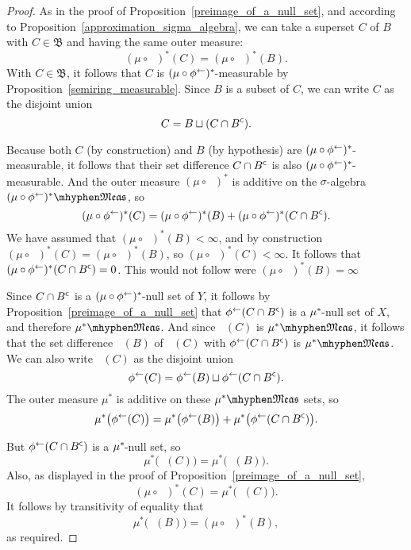 \documentclass[
twoside=true,
paper=letter,
fontsize=9pt,
pagesize=auto,
leqno,
openany,
headsepline,
overfullrule,
]{scrbook}
\theoremstyle{plain}
\theoremstyle{plain}
\theoremstyle{definition}
\theoremstyle{bfnoteitalic}
\theoremstyle{bfnoteroman}
\newcommand{\sigalg}[1]{\mathfrak{#1}}
\newcommand{\textsigma}{\hbox{\large{$\sigma$}}\kern-1pt}
\newcommand{\comp}{^{\hbox{\tiny{$\mathsf C$}}}}
\newcommand{\preimage}[1]{\mathop{#1^{\leftarrow}}}
\newcommand{\meets}{\cap}
\newcommand{\sigmaalgebraii}{\sigalg{B}}
\newcommand{\measurable}[1]{{#1}\mhyphen\mathfrak{Meas}}
\newcommand{\kernast}{\ast\kern-1pt}
\newcommand{\measurespace}{X}
\newcommand{\measurespaceii}{Y}
\newcommand{\measure}{\mu}
\begin{document}
\begin{proof}
As in the proof of Proposition~\ref{preimage_of_a_null_set}, and according to Proposition~\ref{approximation_sigma_algebra}, we can take a superset $C$ of $B$ with $C\in\sigmaalgebraii$ and having the same outer measure: 
\[
(\measure\circ\preimage{\phi})^*(C) =
(\measure\circ\preimage{\phi})^*(B).
\]
With $C\in\sigmaalgebraii$, it follows that $C$ is $(\measure\circ\preimage{\phi})^\kernast$-measurable by Proposition~\ref{semiring_measurable}.
Since $B$ is a subset of $C$, we can write $C$ as the disjoint union
\[
C=B\sqcup (C\meets B\comp).
\]

Because both $C$ (by construction) and $B$ (by hypothesis) are $(\measure\circ\preimage{\phi})^\kernast$-measurable, it follows that their set difference $C\meets B\comp$ is also $(\measure\circ\preimage{\phi})^\kernast$-measurable. And the outer measure 
$(\measure\circ\preimage{\phi})^*$ is additive on the \textsigma-algebra $\measurable{(\measure\circ\preimage{\phi})^*}$, so
\[
(\measure\circ\preimage{\phi})^*(C) =
(\measure\circ\preimage{\phi})^*(B) +
(\measure\circ\preimage{\phi})^*(C\meets B\comp).
\]
We have assumed that $(\measure\circ\preimage{\phi})^*(B) <\infty$, and by construction 
$(\measure\circ\preimage{\phi})^*(C) =
(\measure\circ\preimage{\phi})^*(B)$, so $(\measure\circ\preimage{\phi})^*(C) <\infty$.
It follows that 
$(\measure\circ\preimage{\phi})^*(C\meets B\comp) =0$. This would not follow were 
$(\measure\circ\preimage{\phi})^*(B) = \infty$

Since $C\meets B\comp$ is a $(\measure\circ\preimage{\phi})^\kernast$-null set of $\measurespaceii$, it follows by Proposition~\ref{preimage_of_a_null_set} that 
$\preimage{\phi}(C\meets B\comp)$ is a $\measure^\kernast$-null set of $\measurespace$, and therefore $\measurable{\measure^*}$. And since $\preimage{\phi}(C)$ is $\measurable{\measure^*}$, it follows that the set difference $\preimage{\phi}(B)$ of $\preimage{\phi}(C)$ with $\preimage{\phi}(C\meets B\comp)$ is $\measurable{\measure^*}$.
We can also write $\preimage{\phi}(C)$ as the disjoint union
\[
\preimage{\phi}(C) =
\preimage{\phi}(B) \sqcup \preimage{\phi}(C\meets B\comp).
\]
The outer measure $\measure^*$ is additive on these $\measurable{\measure^*}$ sets, so
\[
\measure^*\bigl(\preimage{\phi}(C)\bigr) = 
\measure^*\bigl(\preimage{\phi}(B)\bigr) +
\measure^*\bigl(\preimage{\phi}(C\meets B\comp)\bigr).
\]

But $\preimage{\phi}(C\meets B\comp)$ is a $\measure^\kernast$-null set, so 
\[
\measure^*\bigl(\preimage{\phi}(C)\bigr) = 
\measure^*\bigl(\preimage{\phi}(B)\bigr).
\]
Also, as displayed in the proof of Proposition~\ref{preimage_of_a_null_set},
\[
(\measure\circ\preimage{\phi})^*(C)
=
\measure^*\bigl(\preimage{\phi}(C)\bigr).
\] 
It follows by transitivity of equality that 
\[
\measure^*\bigl(\preimage{\phi}(B)\bigr) = (\measure\circ\preimage{\phi})^*(B),
\]
as required.
\end{proof}
\end{document}
